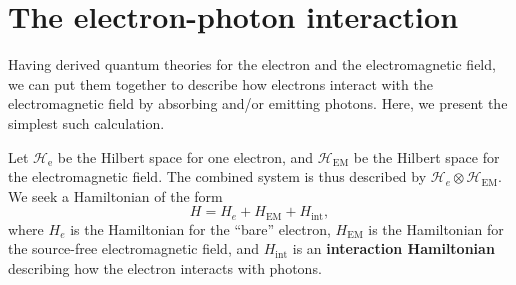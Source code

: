 \documentclass[prx,12pt]{revtex4-2}
\begin{document}
\section{The electron-photon interaction}
\label{sec:decay}

Having derived quantum theories for the electron and the
electromagnetic field, we can put them together to describe how
electrons interact with the electromagnetic field by absorbing and/or
emitting photons.  Here, we present the simplest such calculation.

Let $\mathscr{H}_{\mathrm{e}}$ be the Hilbert space for one electron,
and $\mathscr{H}_{\mathrm{EM}}$ be the Hilbert space for the
electromagnetic field.  The combined system is thus described by
$\mathscr{H}_e \otimes \mathscr{H}_{\mathrm{EM}}$.  We seek a
Hamiltonian of the form
\begin{equation}
  H = H_e + H_{\mathrm{EM}} + H_{\mathrm{int}},
\end{equation}
where $H_e$ is the Hamiltonian for the ``bare'' electron,
$H_{\mathrm{EM}}$ is the Hamiltonian for the source-free
electromagnetic field, and $H_{\mathrm{int}}$ is an
\textbf{interaction Hamiltonian} describing how the electron interacts
with photons.
\end{document}
